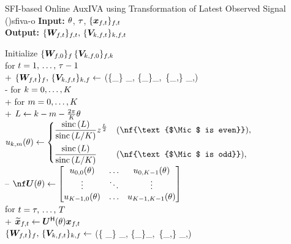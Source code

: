 \documentclass[sip,biber]{now-journal}
\begin{document}
\begin{algorithm}{SFI-based Online AuxIVA using Transformation of Latest Observed Signal (\SFIIVAo)}{sfiva-o}
  \textbf{Input:} $\theta$, $\tau$, $\{\Obs _{\ft}\} _{\ft}$ \\
  \textbf{Output:} $\{\Demix _{\ft}\}_{\ft},\, \{\cov _{\src,\ft}\}_{\src,\ft}$
  \begin{pseudo}
    Initialize $\{\bm{W} _{f,0}\} _{f} \, \{\bm{V} _{k,f,0}\} _{f,k}$ \\
    for $t = 1,\, \dots,\, \tau - 1$ \\+
      $\{\Demix _{\ft}\}_{\freq},\, \{\cov _{\src,\ft}\} _{\src,\freq} \gets$ (\{\Obs _{\ft}\} _{\freq}, \{\Demix _{\ft[-1]}\}_{\freq},\, \{\cov _{\src,\ft[-1]}\} _{\src,\freq}) \\-
    for $k = 0, \dots, K$ \\+
      for $m = 0, \dots, K$ \\+
        $L \gets k - m - \frac{2\pi}{K} \theta$ \\
        $\rotmat _{\src,\mic}(\rotSpat) \gets
          \begin{cases}
            \displaystyle \frac{\sinc{(\rotIdx)}}{\sinc{\left(\rotIdx / \Mic\right)}} \twid ^{\frac{\rotIdx}{2}} & (\nf{\text{$\Mic$ is even}}),\\[1em]
            \displaystyle \frac{\sinc{(\rotIdx)}}{\sinc{\left(\rotIdx / \Mic\right)}} & (\nf{\text{$\Mic$ is odd}}),
          \end{cases}
        $ \ct{\eqref{eq:rot:sinc}} \\--
    $\nf\rotMat (\rotSpat) \gets
      \begin{bmatrix}
        \rotmat _{0, 0}(\rotSpat) & \dots & \rotmat _{0, \Mic - 1}(\rotSpat) \\
        \vdots & \ddots & \vdots \\
        \rotmat _{\Mic - 1, 0}(\rotSpat) & \dots & \rotmat _{\Mic - 1, \Mic - 1}(\rotSpat)
      \end{bmatrix}
      $ \ct{\eqref{eq:rotmat}} \\
    for $t = \tau,\, \dots,\, T$ \\+
      $\refpos{\Obs} _{\ft} \gets \rotMat ^{\hermite} (\rotSpat) \Obs _{\ft}$ \ct{$(\forall \freq)$} \\
      $\{\Demix _{\ft}\}_{\freq},\, \{\cov _{\src,\ft}\} _{\src,\freq} \gets$ (\{ _{\ft}\} _{\freq}, \{\Demix _{\ft[-1]}\}_{\freq},\, \{\cov _{\src,\ft[-1]}\} _{\src,\freq})
  \end{pseudo}
\end{algorithm}
\end{document}
